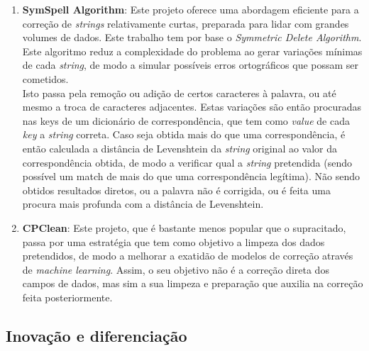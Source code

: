 \documentclass[a4paper,12pt]{article}
\begin{document}
\begin{enumerate}
    \item \textbf{SymSpell Algorithm}:
    Este projeto oferece uma abordagem eficiente para a correção de \textit{strings} relativamente curtas, preparada para lidar com grandes volumes de dados. Este trabalho tem por base o \textit{Symmetric Delete Algorithm}. Este algoritmo reduz a complexidade do problema ao gerar variações mínimas de cada \textit{string}, de modo a simular possíveis erros ortográficos que possam ser cometidos.\\
    Isto passa pela remoção ou adição de certos caracteres à palavra, ou até mesmo a troca de caracteres adjacentes. Estas variações são então procuradas nas keys de um dicionário de correspondência, que tem como \textit{value} de cada \textit{key} a \textit{string} correta. Caso seja obtida mais do que uma correspondência, é então calculada a distância de Levenshtein da \textit{string} original ao valor da correspondência obtida, de modo a verificar qual a \textit{string} pretendida (sendo possível um match de mais do que uma correspondência legítima). Não sendo obtidos resultados diretos, ou a palavra não é corrigida, ou é feita uma procura mais profunda com a distância de Levenshtein.

    \item \textbf{CPClean}:
    Este projeto, que é bastante menos popular que o supracitado, passa por uma estratégia que tem como objetivo a limpeza dos dados pretendidos, de modo a melhorar a exatidão de modelos de correção através de \textit{machine learning}. Assim, o seu objetivo não é a correção direta dos campos de dados, mas sim a sua limpeza e preparação que auxilia na correção feita posteriormente.
\end{enumerate}

\subsection{Inovação e diferenciação}
\end{document}
